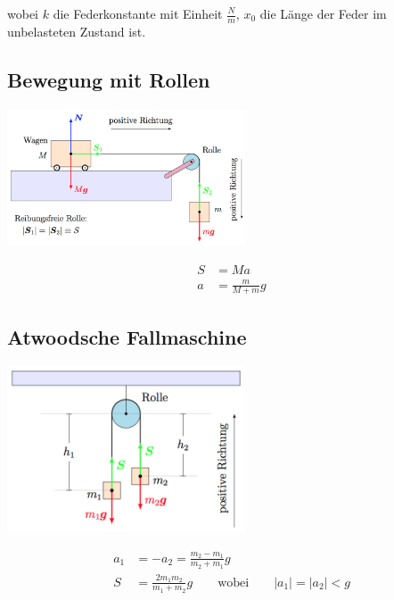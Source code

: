 \documentclass[7pt]{article}
\begin{document}
\begin{multicols*}{3}
wobei $k$ die Federkonstante mit Einheit $\frac{N}{m}$, $x_0$ die Länge der Feder im unbelasteten Zustand ist.

\subsection{Bewegung mit Rollen}

\begin{center}
	\includegraphics[width=200pt]{images/bewegung_rollen}
\end{center}

\begin{equation*}
\begin{split}
	S & = Ma \\
	a & = \frac{m}{M + m}g
\end{split}
\end{equation*}

\subsection{Atwoodsche Fallmaschine}

\begin{center}
	\includegraphics[width=200pt]{images/fallmaschine}
\end{center}

\begin{equation*}
\begin{split}
	a_1 & = -a_2 = \frac{m_2-m_1}{m_2+m_1}g \\
	  S & = \frac{2m_1m_2}{m_1+m_2}g \qquad\text{wobei}\qquad |a_1|=|a_2| < g
\end{split}
\end{equation*}


\end{multicols*}
\end{document}
